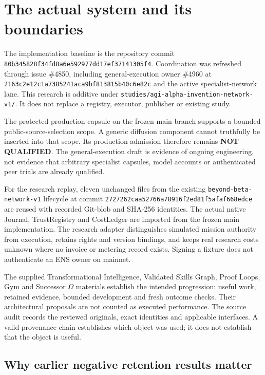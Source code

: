 \documentclass[11pt,letterpaper]{article}
\newcommand{\status}[1]{\textsf{\textbf{#1}}}
\begin{document}
\section{The actual system and its boundaries}

The implementation baseline is the repository commit \texttt{80b345828f34fd8a6e592977dd17ef37141305f4}. Coordination was refreshed through issue \#4850, including general-execution owner \#4960 at \texttt{2163c2e12c1a7385241aca9bf813815b40c6e82c} and the active specialist-network lane. This research is additive under \texttt{studies/agi-alpha-invention-network-v1/}. It does not replace a registry, executor, publisher or existing study.

The protected production capsule on the frozen main branch supports a bounded public-source-selection scope. A generic diffusion component cannot truthfully be inserted into that scope. Its production admission therefore remains \status{NOT QUALIFIED}. The general-execution draft is evidence of ongoing engineering, not evidence that arbitrary specialist capsules, model accounts or authenticated peer trials are already qualified.

For the research replay, eleven unchanged files from the existing \texttt{beyond-beta-network-v1} lifecycle at commit \texttt{2727262caa52766a78916f2ed81f5afaf668edce} are reused with recorded Git-blob and SHA-256 identities. The actual native Journal, TrustRegistry and CostLedger are imported from the frozen main implementation. The research adapter distinguishes simulated mission authority from execution, retains rights and version bindings, and keeps real research costs unknown where no invoice or metering record exists. Signing a fixture does not authenticate an ENS owner on mainnet.

The supplied Transformational Intelligence, Validated Skills Graph, Proof Loops, Gym and Successor $\Omega$ materials establish the intended progression: useful work, retained evidence, bounded development and fresh outcome checks. Their architectural proposals are not counted as executed performance. The source audit records the reviewed originals, exact identities and applicable interfaces. A valid provenance chain establishes which object was used; it does not establish that the object is useful.

\subsection{Why earlier negative retention results matter}
\end{document}
